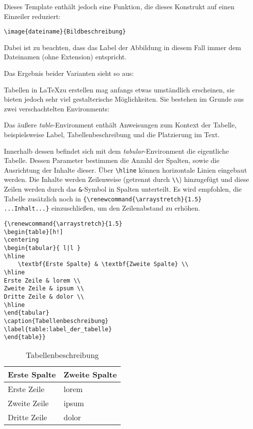 Dieses Template enthält jedoch eine Funktion, die dieses Konstrukt auf einen Einzeiler reduziert:

\begin{verbatim}
\image{dateiname}{Bildbeschreibung}
\end{verbatim}

Dabei ist zu beachten, dass das Label der Abbildung in diesem Fall immer dem Dateinamen (ohne Extension) entspricht.

Das Ergebnis beider Varianten sieht so aus:



Tabellen in \LaTeX zu erstellen mag anfangs etwas umständlich erscheinen, sie bieten jedoch sehr viel gestalterische Möglichkeiten.
Sie bestehen im Grunde aus zwei verschachtelten Environments:

Das äußere \textit{table}-Environment enthält Anweisungen zum Kontext der Tabelle, beispielsweise Label, Tabellenbeschreibung und die Platzierung im Text.

Innerhalb dessen befindet sich mit dem \textit{tabular}-Environment die eigentliche Tabelle.
Dessen Parameter bestimmen die Anzahl der Spalten, sowie die Ausrichtung der Inhalte dieser.
Über \verb|\hline| können horizontale Linien eingebaut werden.
Die Inhalte werden Zeilenweise (getrennt durch \verb|\\|) hinzugefügt und diese Zeilen werden durch das \verb|&|-Symbol in Spalten unterteilt.
Es wird empfohlen, die Tabelle zusätzlich noch in \verb|{\renewcommand{\arraystretch}{1.5} ...Inhalt...}| einzuschließen, um den Zeilenabstand zu erhöhen.

\begin{verbatim}
{\renewcommand{\arraystretch}{1.5}
\begin{table}[h!]
\centering
\begin{tabular}{ l|l } 
\hline
    \textbf{Erste Spalte} & \textbf{Zweite Spalte} \\
\hline
Erste Zeile & lorem \\
Zweite Zeile & ipsum \\
Dritte Zeile & dolor \\
\hline
\end{tabular}
\caption{Tabellenbeschreibung}
\label{table:label_der_tabelle}
\end{table}}
\end{verbatim}

{\renewcommand{\arraystretch}{1.5}
\begin{table}[h!]
\centering
\begin{tabular}{ l|l } 
\hline
    \textbf{Erste Spalte} & \textbf{Zweite Spalte} \\
\hline
Erste Zeile & lorem \\
Zweite Zeile & ipsum \\
Dritte Zeile & dolor \\
\hline
\end{tabular}
\caption{Tabellenbeschreibung}
\label{table:label_der_tabelle}
\end{table}}

